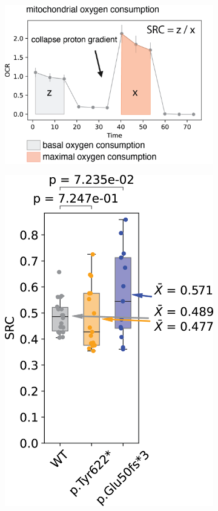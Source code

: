 \begin{figure}[ht]
\begin{subfigure}[t]{0.33\textwidth}
        \includegraphics[width=\textwidth]{./extended_plots/src_cartoon.png}        
    \end{subfigure} 
    \begin{subfigure}[t]{0.25\textwidth}
        \caption{}
        \includegraphics[width=\textwidth]{./extended_plots/src_quantification.png}        

\end{subfigure}
\end{figure}
